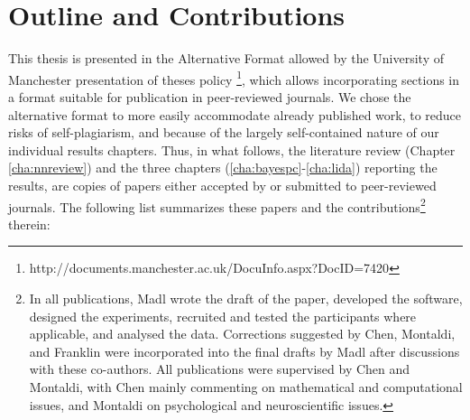 \section{Outline and Contributions}
\label{sec:intro:outline}

This thesis is presented in the Alternative Format allowed by the University of Manchester presentation of theses policy \footnote{http://documents.manchester.ac.uk/DocuInfo.aspx?DocID=7420}, which allows incorporating sections in a format suitable for publication in peer-reviewed journals. We chose the alternative format to more easily accommodate already published work, to reduce risks of self-plagiarism,  and because of the largely self-contained nature of our individual results chapters. Thus, in what follows, the literature review (Chapter \ref{cha:nnreview}) and the three chapters (\ref{cha:bayespc}-\ref{cha:lida}) reporting the results, are copies of papers either accepted by or submitted to peer-reviewed journals. The following list summarizes these papers and the contributions\footnote{In all publications, Madl wrote the draft of the paper, developed the software, designed the experiments, recruited and tested the participants where applicable, and analysed the data. Corrections suggested by Chen, Montaldi, and Franklin were incorporated into the final drafts by Madl after discussions with these co-authors. All publications were supervised by Chen and Montaldi, with Chen mainly commenting on mathematical and computational issues, and Montaldi on psychological and neuroscientific issues.} therein:

